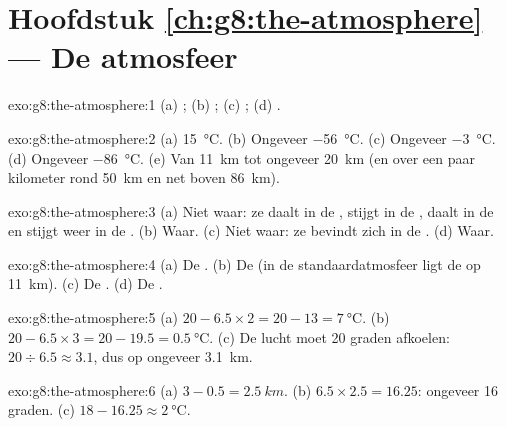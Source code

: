 \section*{Hoofdstuk \ref{ch:g8:the-atmosphere} --- De atmosfeer}

\begin{solution}{exo:g8:the-atmosphere:1}
(a) ; (b) ; (c) ; (d) .
\end{solution}

\begin{solution}{exo:g8:the-atmosphere:2}
(a) \qty{15}{\degreeCelsius}. (b) Ongeveer \qty{-56}{\degreeCelsius}.
(c) Ongeveer \qty{-3}{\degreeCelsius}. (d) Ongeveer \qty{-86}{\degreeCelsius}.
(e) Van \qty{11}{km} tot ongeveer \qty{20}{km} (en over een paar kilometer
rond \qty{50}{km} en net boven \qty{86}{km}).
\end{solution}

\begin{solution}{exo:g8:the-atmosphere:3}
(a) Niet waar: ze daalt in de , stijgt in de , daalt
in de  en stijgt weer in de . (b) Waar. (c) Niet waar:
ze bevindt zich in de . (d) Waar.
\end{solution}

\begin{solution}{exo:g8:the-atmosphere:4}
(a) De . (b) De  (in de standaardatmosfeer ligt de
 op \qty{11}{km}). (c) De . (d) De .
\end{solution}

\begin{solution}{exo:g8:the-atmosphere:5}
(a) $20 - 6.5 \times 2 = 20 - 13 = \qty{7}{\degreeCelsius}$. (b) $20 -
6.5 \times 3 = 20 - 19.5 = \qty{0.5}{\degreeCelsius}$. (c) De lucht moet
20 graden afkoelen: $20 \div 6.5 \approx 3.1$, dus op ongeveer
\qty{3.1}{km}.
\end{solution}

\begin{solution}{exo:g8:the-atmosphere:6}
(a) $3 - 0.5 = \qty{2.5}{km}$. (b) $6.5 \times 2.5 = 16.25$: ongeveer 16
graden. (c) $18 - 16.25 \approx \qty{2}{\degreeCelsius}$.
\end{solution}

